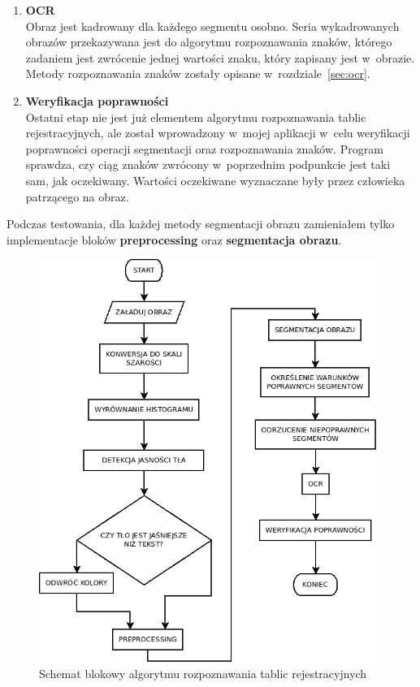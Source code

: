 \begin{enumerate}
    \item \textbf{OCR}\\
      Obraz jest kadrowany dla każdego segmentu osobno. Seria wykadrowanych obrazów przekazywana jest do algorytmu rozpoznawania znaków, którego zadaniem jest zwrócenie jednej wartości znaku, który zapisany jest w~obrazie. Metody rozpoznawania znaków zostały opisane w~rozdziale~\ref{sec:ocr}.
    \item \textbf{Weryfikacja poprawności}\\
      Ostatni etap nie jest już elementem algorytmu rozpoznawania tablic rejestracyjnych, ale został wprowadzony w~mojej aplikacji w~celu weryfikacji poprawności operacji segmentacji oraz rozpoznawania znaków. Program sprawdza, czy ciąg znaków zwrócony w~poprzednim podpunkcie jest taki sam, jak oczekiwany. Wartości oczekiwane wyznaczane były przez człowieka patrzącego na obraz.
\end{enumerate}
Podczas testowania, dla każdej metody segmentacji obrazu zamieniałem tylko implementacje bloków \textbf{preprocessing} oraz \textbf{segmentacja obrazu}.
\begin{figure}
  \centering
  \includegraphics[width=0.98\textwidth]{img/main-flowchart}
  \caption{Schemat blokowy algorytmu rozpoznawania tablic rejestracyjnych}
  \label{fig:main_flowchart}
\end{figure}

